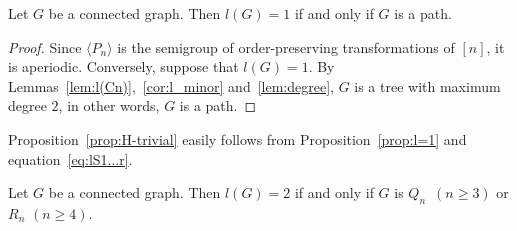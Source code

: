 \documentclass[ALCO,ThmDefs,Unicode,epreuves]{cedram}
\newcommand{\genset}[1]{\langle#1\rangle}
\newcommand{\nset}{[n]}
\begin{document}
\begin{proposition} \label{prop:l=1}
 Let $G$ be a connected graph. Then $l(G) = 1$ if and only if
 $G$ is a path.
\end{proposition}

\begin{proof}
 Since $\genset{P_n}$ is the semigroup of order-preserving transformations of
 $\nset$, it is aperiodic. Conversely, suppose that $l(G) = 1$. By
 Lemmas~\ref{lem:l(Cn)},~\ref{cor:l_minor} and~\ref{lem:degree}, $G$
 is a tree with maximum degree $2$, in other words, $G$ is a path.
\end{proof}

Proposition~\ref{prop:H-trivial} easily follows from Proposition~\ref{prop:l=1}
and equation~\eqref{eq:lS1...r}.

\begin{proposition} \label{prop:l=2}
 Let $G$ be a connected graph. Then $l(G) = 2$ if and only if $G$
 is $Q_n$~$(n\geq3)$ or $R_n$ $(n\geq4)$.
\end{proposition}
\end{document}

